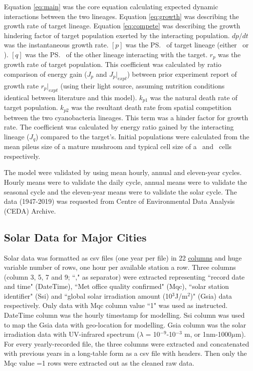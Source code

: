 \documentclass[../thesis.tex]{subfiles} %
\begin{document}
Equation \ref{eq:main} was the core equation calculating expected dynamic interactions between the two lineages.  Equation \ref{eq:growth} was describing the growth rate of target lineage.  Equation \ref{eq:compete} was describing the growth hindering factor of target population exerted by the interacting population.  $dp/dt$ was the instantaneous growth rate.  $[p]$ was the \ps\ of target lineage (either \As\ or \Cs).  $[q]$ was the \ps\ of the other lineage interacting with the target.  $r_p$ was the growth rate of target population.  This coefficient was calculated by ratio comparison of energy gain ($J_p$ and $J_p|_{expt}$) between prior experiment report of growth rate $r_p|_{expt}$ (using their light source, assuming nutrition conditions identical between literature and this model).  $k_{p1}$ was the natural death rate of target population.  $k_{p2}$ was the resultant death rate from spatial competition between the two cyanobacteria lineages.  This term was a hinder factor for growth rate.  The coefficient was calculated by energy ratio gained by the interacting lineage ($J_q$) compared to the target's.  Initial populations were calculated from the mean pileus size of a mature mushroom and typical cell size of a \As\ and \Ct\ cells respectively.

The model were validated by using mean hourly, annual and eleven-year cycles.  Hourly means were to validate the daily cycle, annual means were to validate the seasonal cycle and the eleven-year means were to validate the solar cycle.  The data (1947-2019) was requested from Centre of Environmental Data Analysis (CEDA) Archive.\autocite{solarData}

\subsection{Solar Data for Major Cities} %
Solar data was formatted as csv files (one year per file) in 22 \href{https://artefacts.ceda.ac.uk/badc_datadocs/ukmo-midas/RO_Table.html#definition}{columns} and huge variable number of rows, one hour per available station a row.  Three columns (column 3, 5, 7 and 9; ``," as separator) were extracted representing ``record date and time" (DateTime), ``Met office quality confirmed" (Mqc), ``solar station identifier" (Ssi) and ``global solar irradiation amount (10$^{3}$J/m$^{2}$)" (Gsia) data respectively.  Only data with Mqc column value ``1" was used as instructed.  DateTime column was the hourly timestamp for modelling. Ssi column was used to map the Gsia data with geo-location for modelling.  Gsia column was the solar irradiation data with UV-infrared spectrum ($\lambda$ = 10$^{-9}$-10$^{-3}$ m, or 1nm-1000$\mu$m).  For every yearly-recorded file, the three columns were extracted and concatenated with previous years in a long-table form as a csv file with headers.  Then only the Mqc value =1 rows were extracted out as the cleaned raw data.
\end{document}
